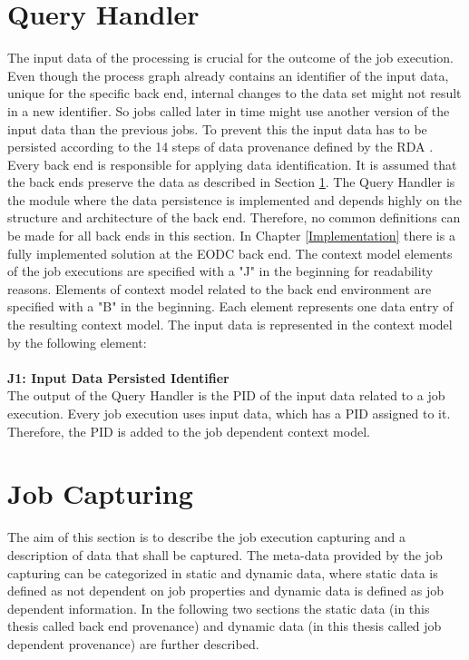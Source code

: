 \documentclass[draft,final]{vutinfth} %
\begin{document}
\section{Query Handler}\label{Design:Data Identification}
The input data of the processing is crucial for the outcome of the job execution. Even though the process graph already contains an identifier of the input data, unique for the specific back end, internal changes to the data set might not result in a new identifier. So jobs called later in time might use another version of the input data than the previous jobs. To prevent this the input data has to be persisted according to the 14 steps of data provenance defined by the RDA \cite{rauber2016identification}. Every back end is responsible for applying data identification. It is assumed that the back ends preserve the data as described in Section \ref{Design:Data Identification}. The Query Handler is the module where the data persistence is implemented and depends highly on the structure and architecture of the back end. Therefore, no common definitions can be made for all back ends in this section. In Chapter \ref{Implementation} there is a fully implemented solution at the EODC back end. The context model elements of the job executions are specified with a "J" in the beginning for readability reasons. Elements of context model related to the back end environment are specified with a "B" in the beginning. Each element represents one data entry of the resulting context model. The input data is represented in the context model by the following element: \\
\\
\textbf{J1: Input Data Persisted Identifier} \\
The output of the Query Handler is the PID of the input data related to a job execution. Every job execution uses input data, which has a PID assigned to it. Therefore, the PID is added to the job dependent context model. 

\section{Job Capturing}\label{Design:Job Capturing}
The aim of this section is to describe the job execution capturing and a description of data that shall be captured. The meta-data provided by the job capturing can be categorized in static and dynamic data, where static data is defined as not dependent on job properties and dynamic data is defined as job dependent information. In the following two sections the static data (in this thesis called back end provenance) and dynamic data (in this thesis called job dependent provenance) are further described.     
\end{document}

